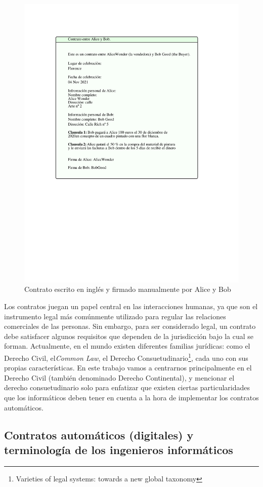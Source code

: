 \documentclass[12pt]{report} %
\begin{document}
\begin{figure}
\centering
\includegraphics[width=0.85\columnwidth]{imagenes/cuadrocontratos1.pdf}
\caption{Contrato escrito en inglés y firmado manualmente por Alice y Bob}
\label{cuadrocontratos1}
\end{figure} 


Los contratos juegan un papel central en las interacciones humanas, ya que son el instrumento legal más comúnmente utilizado para regular las relaciones comerciales de las personas. Sin embargo, para ser considerado legal, un contrato debe satisfacer algunos requisitos que dependen de la jurisdicción bajo la cual se forman. Actualmente, en el mundo existen diferentes familias jurídicas: como el Derecho Civil, el\textit{Common Law}, el Derecho Consuetudinario\footnote{\cite{Mathias2016}Varieties of legal systems: towards a new global taxonomy}, cada uno con sus propias características. En este trabajo vamos a centrarnos principalmente en el Derecho Civil (también denominado Derecho Continental), y mencionar el derecho consuetudinario solo para enfatizar que existen ciertas particularidades que los informáticos deben tener en cuenta a la hora de implementar los contratos automáticos.

\subsection{Contratos automáticos (digitales) y terminología de los ingenieros informáticos}
\end{document}
